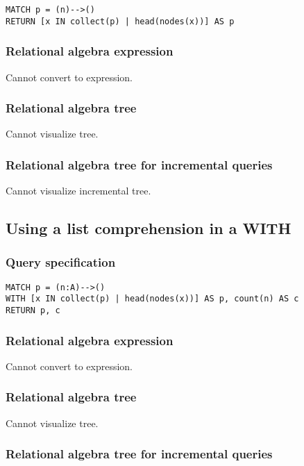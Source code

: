 \begin{lstlisting}
MATCH p = (n)-->()
RETURN [x IN collect(p) | head(nodes(x))] AS p
\end{lstlisting}

\subsubsection*{Relational algebra expression}

Cannot convert to expression.

\subsubsection*{Relational algebra tree}

Cannot visualize tree.

\subsubsection*{Relational algebra tree for incremental queries}

Cannot visualize incremental tree.

\subsection{Using a list comprehension in a WITH}

\subsubsection*{Query specification}

\begin{lstlisting}
MATCH p = (n:A)-->()
WITH [x IN collect(p) | head(nodes(x))] AS p, count(n) AS c
RETURN p, c
\end{lstlisting}

\subsubsection*{Relational algebra expression}

Cannot convert to expression.

\subsubsection*{Relational algebra tree}

Cannot visualize tree.

\subsubsection*{Relational algebra tree for incremental queries}

